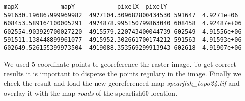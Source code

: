 \begin{verbatim}
mapX    		mapY    		pixelX  pixelY
591630.196867999969982  4927104.309682800434530 591647  4.9271e+06
608453.589164100005291  4924878.995150799863040 608458  4.92487e+06
602554.903929700027220  4915579.220743400044739 602549  4.91556e+06
591511.138448899961077  4915952.302661700174212 591563  4.91593e+06
602649.526155399973504  4919088.353569299913943 602618  4.91907e+06
\end{verbatim} 

We used 5 coordinate points to georeference the raster image.
To get correct results it is important to disperse the points regulary in the image.
Finally we check the result and load the new georeferenced map \textsl{spearfish\_topo24.tif} and overlay it with the map \textsl{roads} of the spearfish60 location.

